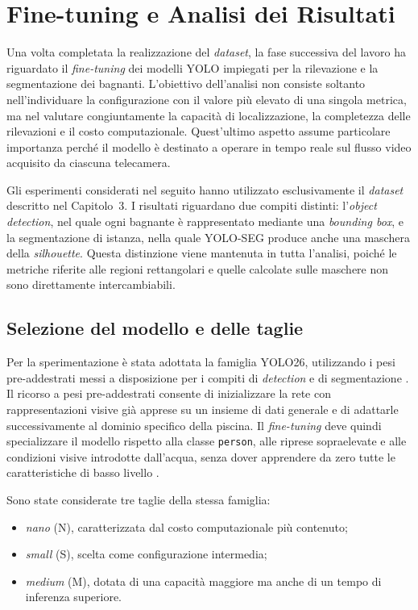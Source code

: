 \chapter{Fine-tuning e Analisi dei Risultati}

Una volta completata la realizzazione del \textit{dataset}, la fase successiva del lavoro ha riguardato il \textit{fine-tuning} dei modelli YOLO impiegati per la rilevazione e la segmentazione dei bagnanti. L'obiettivo dell'analisi non consiste soltanto nell'individuare la configurazione con il valore più elevato di una singola metrica, ma nel valutare congiuntamente la capacità di localizzazione, la completezza delle rilevazioni e il costo computazionale. Quest'ultimo aspetto assume particolare importanza perché il modello è destinato a operare in tempo reale sul flusso video acquisito da ciascuna telecamera.

Gli esperimenti considerati nel seguito hanno utilizzato esclusivamente il \textit{dataset} descritto nel Capitolo~3. I risultati riguardano due compiti distinti: l'\textit{object detection}, nel quale ogni bagnante è rappresentato mediante una \textit{bounding box}, e la segmentazione di istanza, nella quale YOLO-SEG produce anche una maschera della \textit{silhouette}. Questa distinzione viene mantenuta in tutta l'analisi, poiché le metriche riferite alle regioni rettangolari e quelle calcolate sulle maschere non sono direttamente intercambiabili.

\section{Selezione del modello e delle taglie}

Per la sperimentazione è stata adottata la famiglia YOLO26, utilizzando i pesi pre-addestrati messi a disposizione per i compiti di \textit{detection} e di segmentazione \cite{Jocher2026YOLO26}. Il ricorso a pesi pre-addestrati consente di inizializzare la rete con rappresentazioni visive già apprese su un insieme di dati generale e di adattarle successivamente al dominio specifico della piscina. Il \textit{fine-tuning} deve quindi specializzare il modello rispetto alla classe \texttt{person}, alle riprese sopraelevate e alle condizioni visive introdotte dall'acqua, senza dover apprendere da zero tutte le caratteristiche di basso livello \cite{Yosinski2014Transferable}.

Sono state considerate tre taglie della stessa famiglia:

\begin{itemize}
    \item \textit{nano} (N), caratterizzata dal costo computazionale più contenuto;
    \item \textit{small} (S), scelta come configurazione intermedia;
    \item \textit{medium} (M), dotata di una capacità maggiore ma anche di un tempo di inferenza superiore.
\end{itemize}

